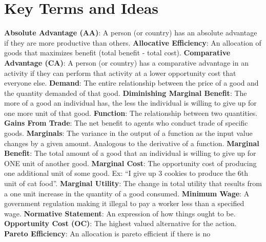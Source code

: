 \documentclass[letterpaper, 12pt]{article}
\begin{document}
\section{Key Terms and Ideas}
\textbf{Absolute Advantage (AA)}: A person (or country) has an absolute
advantage if they are more productive than others.
\newline
\textbf{Allocative Efficiency}: An allocation of goods that maximizes benefit
(total benefit - total cost).
\newline
\textbf{Comparative Advantage (CA)}: A person (or country) has a comparative
advantage in an activity if they can perform that activity at a lower
opportunity cost that everyone else.
\newline
\textbf{Demand}: The entire relationship between the price of a good and the
quantity demanded of that good.
\newline
\textbf{Diminishing Marginal Benefit}: The more of a good an individual has,
the less the individual is willing to give up for one more unit of that good.
\newline
\textbf{Function}: The relationship between two quantities.
\newline
\textbf{Gains From Trade}: The net benefit to agents who conduct trade of
specific goods.
\newline
\textbf{Marginals}: The variance in the output of a function as the input value
changes by a given amount. Analogous to the derivative of a function.
\newline
\textbf{Marginal Benefit}: The total amount of a good that an individual is
willing to give up for ONE unit of another good.
\newline
\textbf{Marginal Cost}: The opportunity cost of producing one additional unit
of some good. Ex: ``I give up 3 cookies to produce the 6th unit of cat food''.
\newline
\textbf{Marginal Utility}: The change in total utility that results from a
one unit increase in the quantity of a good consumed.
\newline
\textbf{Minimum Wage}: A government regulation making it illegal to pay a
worker less than a specified wage.
\newline
\textbf{Normative Statement}: An expression of how things ought to be.
\newline
\textbf{Opportunity Cost (OC)}: The highest valued alternative for the action.
\newline
\textbf{Pareto Efficiency}: An allocation is pareto efficient if there is no
\end{document}
